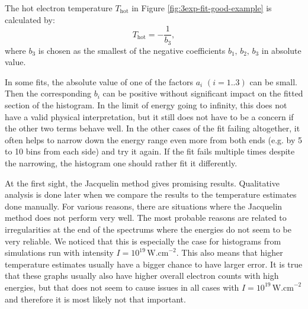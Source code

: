 The hot electron temperature $T_\mathrm{hot}$ in Figure \ref{fig:3exp-fit-good-example} is calculated by:
\begin{equation}
	\label{eq:t-hot-from-b}
	T_{\mathrm{hot}} = -\frac{1}{b_3},
\end{equation}
where $b_3$ is chosen as the smallest of the negative coefficients $b_1,\, b_2,\, b_3$ in absolute value. 

In some fits, the absolute value of one of the factors $a_i$ $(i=1..3)$ can be small. Then the corresponding $b_i$ can be positive without significant impact on the fitted section of the histogram. In the limit of energy going to infinity, this does not have a valid physical interpretation, but it still does not have to be a concern if the other two terms behave well. In the other cases of the fit failing altogether, it often helps to narrow down the energy range even more from both ends (e.g. by 5 to 10 bins from each side) and try it again. If the fit fails multiple times despite the narrowing, the histogram one should rather fit it differently.

At the first sight, the Jacquelin method gives promising results. Qualitative analysis is done later when we compare the results to the temperature estimates done manually. For various reasons, there are situations where the Jacquelin method does not perform very well. The most probable reasons are related to irregularities at the end of the spectrums where the energies do not seem to be very reliable. We noticed that this is especially the case for histograms from simulations run with intensity $I=10^{19}\,\mathrm{W.cm}^{-2}$. This also means that higher temperature estimates usually have a bigger chance to have larger error. It is true that these graphs usually also have higher overall electron counts with high energies, but that does not seem to cause issues in all cases with $I=10^{19}\,\mathrm{W.cm}^{-2}$ and therefore it is most likely not that important. 

